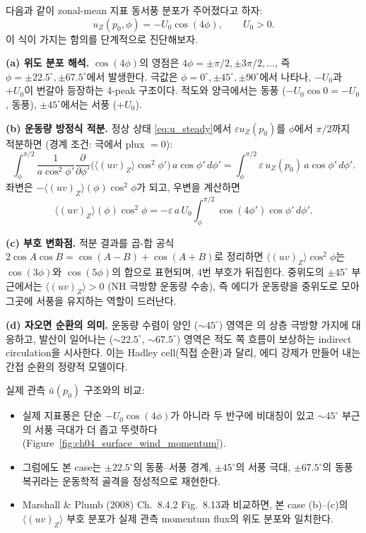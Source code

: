 \begin{example}[자오면 순환 진단: $u_Z(p_0) = -U_0\cos(4\phi)$ Case]\label{ex:ch04_hw5_meridional}
다음과 같이 zonal-mean 지표 동서풍 분포가 주어졌다고 하자:
\[
  u_Z(p_0,\phi) = -U_0\cos(4\phi), \qquad U_0 > 0.
\]
이 식이 가지는 함의를 단계적으로 진단해보자.

\smallskip
\textbf{(a) 위도 분포 해석.}\quad
$\cos(4\phi)$의 영점은 $4\phi = \pm\pi/2, \pm 3\pi/2, \ldots$, 즉
$\phi = \pm 22.5^\circ, \pm 67.5^\circ$에서 발생한다.  극값은
$\phi = 0^\circ, \pm 45^\circ, \pm 90^\circ$에서 나타나, $-U_0$과
$+U_0$이 번갈아 등장하는 4-peak 구조이다.  적도와 양극에서는 동풍
($-U_0\cos 0 = -U_0$, 동풍), $\pm 45^\circ$에서는 서풍 ($+U_0$).

\smallskip
\textbf{(b) 운동량 방정식 적분.}\quad
정상 상태 \eqref{eq:u_steady}에서 $\varepsilon u_Z(p_0)$를
$\phi$에서 $\pi/2$까지 적분하면 (경계 조건: 극에서 plux $=0$):
\[
  \int_{\phi}^{\pi/2}\frac{1}{a\cos^2\phi'}\frac{\partial}{\partial\phi'}
    \bigl(\langle(uv)_Z\rangle\cos^2\phi'\bigr)\,a\cos\phi'\,d\phi'
  = \int_{\phi}^{\pi/2}\varepsilon\,u_Z(p_0)\,a\cos\phi'\,d\phi'.
\]
좌변은 $-\langle(uv)_Z\rangle(\phi)\cos^2\phi$가 되고, 우변을 계산하면
\[
  \langle(uv)_Z\rangle(\phi)\cos^2\phi
  = -\varepsilon\,a\,U_0\int_{\phi}^{\pi/2}\cos(4\phi')\cos\phi'\,d\phi'.
\]

\smallskip
\textbf{(c) 부호 변화점.}\quad
적분 결과를 곱-합 공식 $2\cos A\cos B = \cos(A-B)+\cos(A+B)$로 정리하면
$\langle(uv)_Z\rangle\cos^2\phi$는 $\cos(3\phi)$와 $\cos(5\phi)$의 합으로
표현되며, 4번 부호가 뒤집힌다.  중위도의 $\pm 45^\circ$ 부근에서는
$\langle(uv)_Z\rangle > 0$ (NH 극방향 운동량 수송), 즉 에디가
운동량을 중위도로 모아 그곳에 서풍을 유지하는 역할이 드러난다.

\smallskip
\textbf{(d) 자오면 순환의 의미.}\quad
운동량 수렴이 양인 ($\sim 45^\circ$) 영역은 의
상층 극방향 가지에 대응하고, 발산이 일어나는 ($\sim 22.5^\circ$, $\sim 67.5^\circ$)
영역은 적도 쪽 흐름이 보상하는 indirect circulation을 시사한다.
이는 Hadley cell(직접 순환)과 달리, 에디 강제가 만들어 내는
간접 순환의 정량적 모델이다.
\end{example}

\begin{hisublock}
실제 관측 $\bar{u}(p_0)$ 구조와의 비교:
\begin{itemize}
  \item 실제 지표풍은 단순 $-U_0\cos(4\phi)$가 아니라 두 반구에 비대칭이 있고
        $\sim 45^\circ$ 부근의 서풍 극대가 더 좁고 뚜렷하다 (Figure~\ref{fig:ch04_surface_wind_momentum}).
  \item 그럼에도 본 case는 $\pm 22.5^\circ$의 동풍--서풍 경계, $\pm 45^\circ$의
        서풍 극대, $\pm 67.5^\circ$의 동풍 복귀라는 운동학적 골격을 정성적으로
        재현한다.
  \item Marshall \& Plumb (2008) Ch.~8.4.2 Fig.~8.13과 비교하면, 본 case (b)--(c)의
        $\langle(uv)_Z\rangle$ 부호 분포가 실제 관측 momentum flux의 위도
        분포와 일치한다.
\end{itemize}
\end{hisublock}

